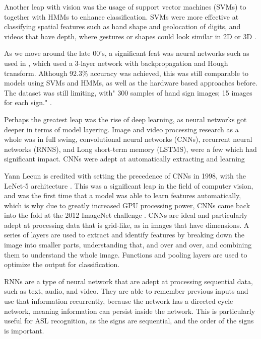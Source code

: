 Another leap with vision was the usage of support vector machines (SVMs) to together with HMMs to enhance classification. SVMs were more effective at classifying spatial features such as hand shape and geolocation of digits, and videos that have depth, where gestures or shapes could look similar in 2D or 3D \cite{voglerParallelHiddenMarkov1999a}.

As we move around the late 00's, a significant feat was neural networks such as used in \cite{munibAmericanSignLanguage2007b}, which used a 3-layer network with backpropagation and Hough transform. Although 92.3\% accuracy was achieved, this was still comparable to models using SVMs and HMMs, as well as the hardware based approaches before. The dataset was still limiting, with" 300 samples of hand sign images; 15 images for each sign." \cite{munibAmericanSignLanguage2007b}.

Perhaps the greatest leap was the rise of deep learning, as neural networks got deeper in terms of model layering. Image and video processing research as a whole was in full swing, convolutional neural networks (CNNs), recurrent neural networks (RNNS), and Long short-term memory (LSTMS), were a few which had significant impact. CNNs were adept at automatically extracting and learning


Yann Lecun is credited with setting the precedence of CNNs in 1998, with the LeNet-5 architecture \cite{lecunGradientbasedLearningApplied1998}. This was a significant leap in the field of computer vision, and was the first time that a model was able to learn features automatically, which is why due to greatly increased GPU processing power, CNNs came back into the fold at the 2012 ImageNet challenge \cite{krizhevskyImageNetClassificationDeep2012}. CNNs are ideal and particularly adept at processing data that is grid-like, as in images that have dimensions.  A series of layers are used to extract and identify features by breaking down the image into smaller parts, understanding that, and over and over, and combining them to understand the whole image. Functions and pooling layers are used to optimize the output for classification.

RNNs are a type of neural network that are adept at processing sequential data, such as text, audio, and video. They are able to remember previous inputs and use that information recurrently, because the network has a directed cycle network, meaning information can persist inside the network. This is particularly useful for ASL recognition, as the signs are sequential, and the order of the signs is important.

